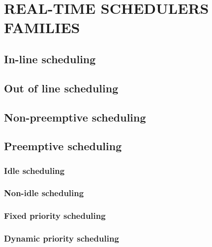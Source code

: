 
\chapter{REAL-TIME SCHEDULERS FAMILIES}
\doMinitoc

\section{In-line scheduling}

\section{Out of line scheduling}

\section{Non-preemptive scheduling}

\section{Preemptive scheduling}

\subsection{Idle scheduling}

\subsection{Non-idle scheduling}

\subsection{Fixed priority scheduling}

\subsection{Dynamic priority scheduling}

